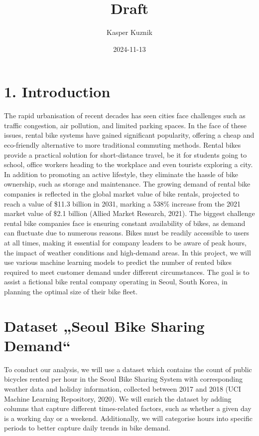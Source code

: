 \documentclass[
]{article}
\title{Draft}
\author{Kasper Kuznik}
\date{2024-11-13}
\begin{document}
\maketitle

\section{1. Introduction}\label{introduction}

The rapid urbanisation of recent decades has seen cities face challenges
such as traffic congestion, air pollution, and limited parking spaces.
In the face of these issues, rental bike systems have gained significant
popularity, offering a cheap and eco-friendly alternative to more
traditional commuting methods. Rental bikes provide a practical solution
for short-distance travel, be it for students going to school, office
workers heading to the workplace and even tourists exploring a city. In
addition to promoting an active lifestyle, they eliminate the hassle of
bike ownership, such as storage and maintenance. The growing demand of
rental bike companies is reflected in the global market value of bike
rentals, projected to reach a value of \$11.3 billion in 2031, marking a
538\% increase from the 2021 market value of \$2.1 billion (Allied
Market Research, 2021). The biggest challenge rental bike companies face
is ensuring constant availability of bikes, as demand can fluctuate due
to numerous reasons. Bikes must be readily accessible to users at all
times, making it essential for company leaders to be aware of peak
hours, the impact of weather conditions and high-demand areas. In this
project, we will use various machine learning models to predict the
number of rented bikes required to meet customer demand under different
circumstances. The goal is to assist a fictional bike rental company
operating in Seoul, South Korea, in planning the optimal size of their
bike fleet.

\section{Dataset „Seoul Bike Sharing
Demand``}\label{dataset-seoul-bike-sharing-demand}

To conduct our analysis, we will use a dataset which contains the count
of public bicycles rented per hour in the Seoul Bike Sharing System with
corresponding weather data and holiday information, collected between
2017 and 2018 (UCI Machine Learning Repository, 2020). We will enrich
the dataset by adding columns that capture different times-related
factors, such as whether a given day is a working day or a weekend.
Additionally, we will categorise hours into specific periods to better
capture daily trends in bike demand.
\end{document}
